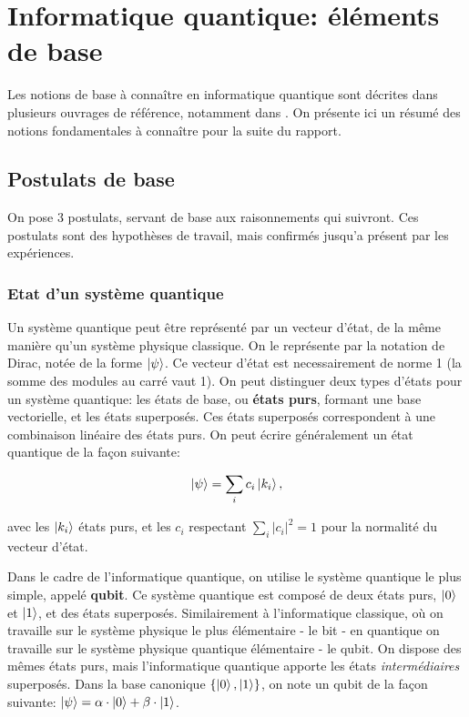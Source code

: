 \chapter{Informatique quantique: éléments de base}


Les notions de base à connaître en informatique quantique sont décrites dans plusieurs ouvrages de référence, notamment dans \cite{Nielsen00, Mermin07}. On présente ici un résumé des notions fondamentales à connaître pour la suite du rapport.

\section{Postulats de base}

On pose 3 postulats, servant de base aux raisonnements qui suivront. Ces postulats sont des hypothèses de travail, mais confirmés jusqu'a présent par les expériences.

\subsection{Etat d'un système quantique}
Un système quantique peut être représenté par un vecteur d'état, de la même manière qu'un système physique classique. On le représente par la notation de Dirac, notée de la forme $\ket{\psi}$. Ce vecteur d'état est necessairement de norme 1 (la somme des modules au carré vaut 1). On peut distinguer deux types d'états pour un système quantique: les états de base, ou \textbf{états purs}, formant une base vectorielle, et les états superposés. Ces états superposés correspondent à une combinaison linéaire des états purs. On peut écrire généralement un état quantique de la façon suivante:

\begin{equation}
    \ket{\psi} = \displaystyle\sum_{i} c_i \ket{k_i},
\end{equation}

avec les $\ket{k_i}$ états purs, et les $c_i$ respectant $ \displaystyle\sum_{i} |c_i|^2 = 1$ pour la normalité du vecteur d'état.

\medbreak

Dans le cadre de l'informatique quantique, on utilise le système quantique le plus simple, appelé \textbf{qubit}. Ce système quantique est composé de deux états purs, $\ket{0}$ et $\ket{1}$, et des états superposés. Similairement à l'informatique classique, où on travaille sur le système physique le plus élémentaire - le bit - en quantique on travaille sur le système physique quantique élémentaire - le qubit. On dispose des mêmes états purs, mais l'informatique quantique apporte les états \textit{intermédiaires} superposés. Dans la base canonique $\{\ket{0}, \ket{1}\}$, on note un qubit de la façon suivante: $\ket{\psi} = \alpha \cdot \ket{0} + \beta \cdot \ket{1}$.

